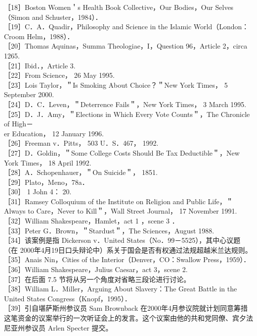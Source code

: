 ［18］Boston Women＇s Health Book Collective，Our Bodies，Our Selves（Simon and Schuster，1984）．\\
［19］C．A．Quadir，Philosophy and Science in the Islamic World（London：Croom Helm，1988）．\\
［20］Thomas Aquinas，Summa Theologiae，I，Question 96，Article 2，circa 1265.\\
［21］Ibid．，Article 3.\\
［22］From Science， 26 May 1995.\\
［23］Lois Taylor，＂Is Smoking About Choice？＂New York Times， 5 September 2000.\\
［24］D．C．Leven，＂Deterrence Fails＂，New York Times， 3 March 1995.\\
［25］D．J．Amy，＂Elections in Which Every Vote Counts＂，The Chronicle of High－\\
er Education， 12 January 1996.\\
［26］Freeman v．Pitts， 503 U．S．467， 1992.\\
［27］D．Goldin，＂Some College Costs Should Be Tax Deductible＂，New York Times， 18 April 1992.\\
［28］A．Schopenhauer，＂On Suicide＂， 1851.\\
［29］Plato，Meno，78a．\\
［30］ 1 John 4： 20.\\
［31］Ramsey Colloquium of the Institute on Religion and Public Life，＂Always to Care，Never to Kill＂，Wall Street Journal， 17 November 1991.\\
［32］William Shakespeare，Hamlet，act 1 ，scene 3 ．\\
［33］Peter G．Brown，＂Stardust＂，The Sciences，August 1988.\\
［34］该案例是指 Dickerson v．United States（No．99－5525），其中心议题（在 2000年4月19日口头辩论中）系关于国会是否有权通过法规超越米兰达规则。\\
［35］Anais Nin，Cities of the Interior（Denver，CO：Swallow Press，1959）．\\
［36］William Shakespeare，Julius Caesar，act 3，scene 2.\\
［37］在后面 7.5 节将从另一个角度对省略三段论进行讨论。\\
［38］William L．Miller，Arguing About Slavery：The Great Battle in the United States Congress（Knopf，1995）．\\
［39］引自堪萨斯州参议员 Sam Brownback 在2000年4月参议院就计划同意筹措这笔资金的议案举行的一次听证会上的发言。这个议案由他的共和党同僚、宾夕法尼亚州参议员 Arlen Specter 提交。\\

